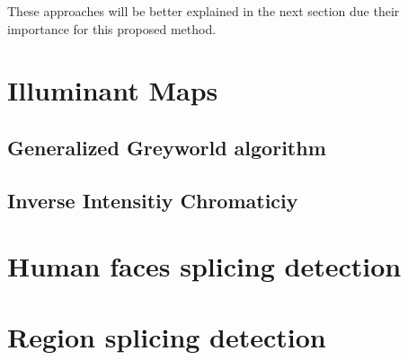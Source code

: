 These approaches will be better explained in the next section due their importance for this proposed method.

\section{Illuminant Maps}



\subsection{Generalized Greyworld algorithm}

\subsection{Inverse Intensitiy Chromaticiy}


\section{Human faces splicing detection}

\section{Region splicing detection}